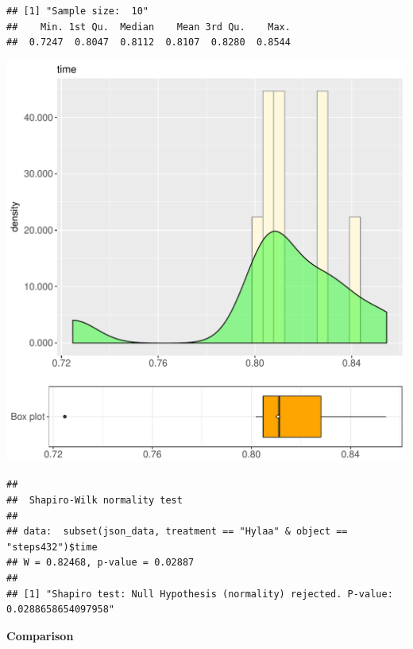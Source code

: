 \documentclass{article}\usepackage[]{graphicx}\usepackage[]{color}
\makeatletter
\def\maxwidth{ %
  \ifdim\Gin@nat@width>\linewidth
    \linewidth
  \else
    \Gin@nat@width
  \fi
}
\newenvironment{kframe}{%
 \def\at@end@of@kframe{}%
 \ifinner\ifhmode%
  \def\at@end@of@kframe{\end{minipage}}%
  \begin{minipage}{\columnwidth}%
 \fi\fi%
 \def\FrameCommand##1{\hskip\@totalleftmargin \hskip-\fboxsep
 \colorbox{shadecolor}{##1}\hskip-\fboxsep
     \hskip-\linewidth \hskip-\@totalleftmargin \hskip\columnwidth}%
 \MakeFramed {\advance\hsize-\width
   \@totalleftmargin\z@ \linewidth\hsize
   \@setminipage}}%
 {\par\unskip\endMakeFramed%
 \at@end@of@kframe}
\newenvironment{knitrout}{}{} %
\makeatother
\begin{document}
\begin{knitrout}
\color{fgcolor}\begin{kframe}
\begin{verbatim}
## [1] "Sample size:  10"
##    Min. 1st Qu.  Median    Mean 3rd Qu.    Max. 
##  0.7247  0.8047  0.8112  0.8107  0.8280  0.8544
\end{verbatim}
\end{kframe}
\includegraphics[width=\maxwidth]{figure/RH2_Hylaa_steps432-1} 
\begin{kframe}\begin{verbatim}
## 
## 	Shapiro-Wilk normality test
## 
## data:  subset(json_data, treatment == "Hylaa" & object == "steps432")$time
## W = 0.82468, p-value = 0.02887
## 
## [1] "Shapiro test: Null Hypothesis (normality) rejected. P-value: 0.0288658654097958"
\end{verbatim}
\end{kframe}
\end{knitrout}
  
 \textbf{Comparison}
  
\end{document}
